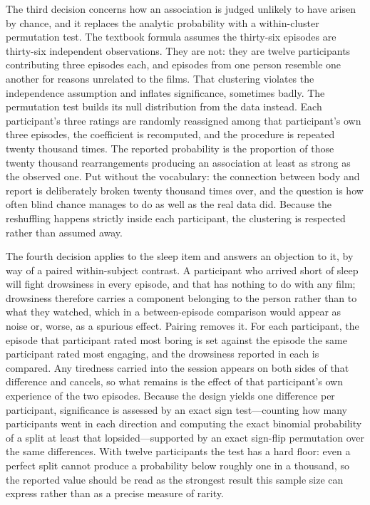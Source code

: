 The third decision concerns how an association is judged unlikely to have arisen by chance, and
it replaces the analytic probability with a within-cluster permutation test. The textbook
formula assumes the thirty-six episodes are thirty-six independent observations. They are not:
they are twelve participants contributing three episodes each, and episodes from one person
resemble one another for reasons unrelated to the films. That clustering violates the
independence assumption and inflates significance, sometimes badly. The permutation test builds
its null distribution from the data instead. Each participant's three ratings are randomly
reassigned among that participant's own three episodes, the coefficient is recomputed, and the
procedure is repeated twenty thousand times. The reported probability is the proportion of those
twenty thousand rearrangements producing an association at least as strong as the observed one.
Put without the vocabulary: the connection between body and report is deliberately broken twenty
thousand times over, and the question is how often blind chance manages to do as well as the
real data did. Because the reshuffling happens strictly inside each participant, the clustering
is respected rather than assumed away.

The fourth decision applies to the sleep item and answers an objection to it, by way of a paired
within-subject contrast. A participant who arrived short of sleep will fight drowsiness in every
episode, and that has nothing to do with any film; drowsiness therefore carries a component
belonging to the person rather than to what they watched, which in a between-episode comparison
would appear as noise or, worse, as a spurious effect. Pairing removes it. For each participant,
the episode that participant rated most boring is set against the episode the same participant
rated most engaging, and the drowsiness reported in each is compared. Any tiredness carried into
the session appears on both sides of that difference and cancels, so what remains is the effect
of that participant's own experience of the two episodes. Because the design yields one
difference per participant, significance is assessed by an exact sign test---counting how many
participants went in each direction and computing the exact binomial probability of a split at
least that lopsided---supported by an exact sign-flip permutation over the same differences.
With twelve participants the test has a hard floor: even a perfect split cannot produce a
probability below roughly one in a thousand, so the reported value should be read as the
strongest result this sample size can express rather than as a precise measure of rarity.

